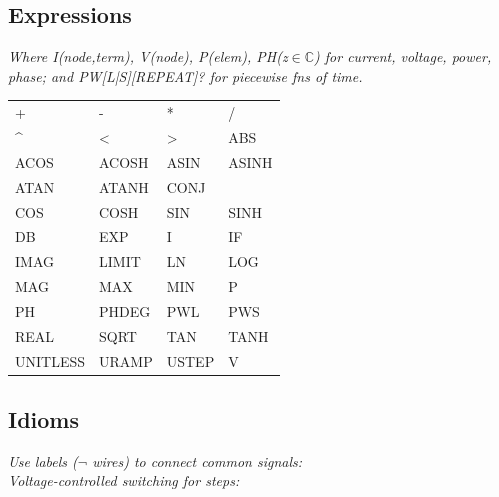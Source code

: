 \subsection*{Expressions}
\textit{Where I(node,term), V(node), P(elem), PH(z$\in \mathbb{C}$) for current, voltage, power, phase; and PW[L|S][REPEAT]? for piecewise fn\textquotesingle s of time.}\\
\begin{tabular}{l l l l}
+    & -   & * & /  \\
\textasciicircum    & <  & > & ABS  \\ 
ACOS    & ACOSH  & ASIN  & ASINH  \\
ATAN    & ATANH  & CONJ  &  \\ 
COS    & COSH  & SIN  & SINH  \\
DB    & EXP  & I  & IF  \\ 
IMAG    & LIMIT  & LN  & LOG  \\
MAG    & MAX  & MIN  & P  \\ 
PH    & PHDEG  & PWL  & PWS  \\ 
REAL    & SQRT  & TAN  & TANH  \\ 
UNITLESS    & URAMP  & USTEP  & V  \\ 
\end{tabular}


\subsection*{Idioms}
\textit{Use labels ($\neg$ wires) to connect common signals:}
\\
\textit{Voltage-controlled switching for steps:}\\

